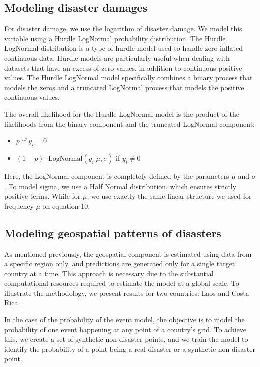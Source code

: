 \subsection{Modeling disaster damages}

For disaster damage, we use the logarithm of disaster damage. We model this variable using a Hurdle LogNormal probability distribution. The Hurdle LogNormal distribution is a type of hurdle model used to handle zero-inflated continuous data. Hurdle models are particularly useful when dealing with datasets that have an excess of zero values, in addition to continuous positive values. The Hurdle LogNormal model specifically combines a binary process that models the zeros and a truncated LogNormal process that models the positive continuous values.

The overall likelihood for the Hurdle LogNormal model is the product of the likelihoods from the binary component and the truncated LogNormal component:

\begin{itemize}
    \item $p$ if $y_i = 0$
    \item $(1-p) \cdot \text{LogNormal}(y_i|\mu, \sigma)$ if $y_i \neq 0$
\end{itemize}

Here, the LogNormal component is completely defined by the parameters $\mu$ and $\sigma$. To model sigma, we use a Half Normal distribution, which ensures strictly positive terms. While for $\mu$, we use exactly the same linear structure we used for frequency $\mu$ on equation 10.

\subsection{Modeling geospatial patterns of disasters}

As mentioned previously, the geospatial component is estimated using data from a specific region only, and predictions are generated only for a single target country at a time. This approach is necessary due to the substantial computational resources required to estimate the model at a global scale. To illustrate the methodology, we present results for two countries: Laos and Costa Rica.

In the case of the probability of the event model, the objective is to model the probability of one event happening at any point of a country's grid. To achieve this, we create a set of synthetic non-disaster points, and we train the model to identify the probability of a point being a real disaster or a synthetic non-disaster point.

